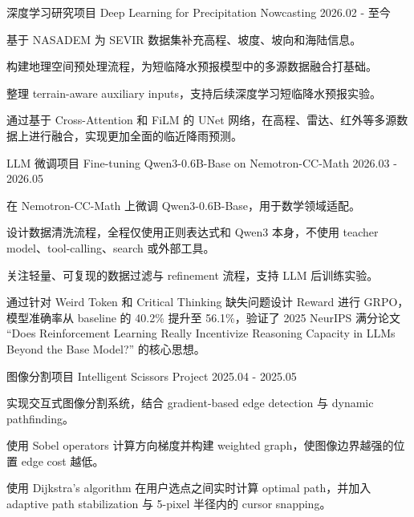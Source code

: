 

\begin{cventries}

  \cventry
    {深度学习研究项目}
    {Deep Learning for Precipitation Nowcasting}
    {}
    {2026.02 - 至今}
    {
      \begin{cvitems}
        \item {基于 NASADEM 为 SEVIR 数据集补充高程、坡度、坡向和海陆信息。}
        \item {构建地理空间预处理流程，为短临降水预报模型中的多源数据融合打基础。}
        \item {整理 terrain-aware auxiliary inputs，支持后续深度学习短临降水预报实验。}
        \item {通过基于 Cross-Attention 和 FiLM 的 UNet 网络，在高程、雷达、红外等多源数据上进行融合，实现更加全面的临近降雨预测。}
      \end{cvitems}
    }

  \cventry
    {LLM 微调项目}
    {Fine-tuning Qwen3-0.6B-Base on Nemotron-CC-Math}
    {}
    {2026.03 - 2026.05}
    {
      \begin{cvitems}
        \item {在 Nemotron-CC-Math 上微调 Qwen3-0.6B-Base，用于数学领域适配。}
        \item {设计数据清洗流程，全程仅使用正则表达式和 Qwen3 本身，不使用 teacher model、tool-calling、search 或外部工具。}
        \item {关注轻量、可复现的数据过滤与 refinement 流程，支持 LLM 后训练实验。}
        \item {通过针对 Weird Token 和 Critical Thinking 缺失问题设计 Reward 进行 GRPO，模型准确率从 baseline 的 40.2\% 提升至 56.1\%，验证了 2025 NeurIPS 满分论文 ``Does Reinforcement Learning Really Incentivize Reasoning Capacity in LLMs Beyond the Base Model?'' 的核心思想。}
      \end{cvitems}
    }

  \cventry
    {图像分割项目}
    {Intelligent Scissors Project}
    {}
    {2025.04 - 2025.05}
    {
      \begin{cvitems}
        \item {实现交互式图像分割系统，结合 gradient-based edge detection 与 dynamic pathfinding。}
        \item {使用 Sobel operators 计算方向梯度并构建 weighted graph，使图像边界越强的位置 edge cost 越低。}
        \item {使用 Dijkstra's algorithm 在用户选点之间实时计算 optimal path，并加入 adaptive path stabilization 与 5-pixel 半径内的 cursor snapping。}
      \end{cvitems}
    }

\end{cventries}
